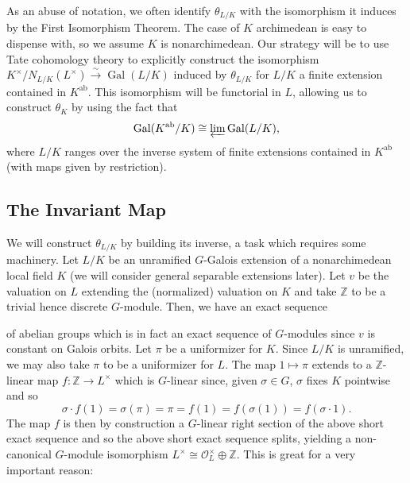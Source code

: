 \documentclass[11pt]{article}
\newcommand{\Z}{\mathbb{Z}}
\newcommand{\iso}{\cong}
\newcommand{\mc}[1]{\mathcal{#1}}
\newcommand{\xto}[1]{\xrightarrow{#1}}
\DeclareMathOperator{\ab}{ab} %
\DeclareMathOperator{\Gal}{Gal}
\renewcommand{\O}{\mc{O}}
\newcommand{\flim}{\varprojlim}
\begin{document}
As an abuse of notation, we often identify $\theta_{L/K}$ with the isomorphism it induces by the First Isomorphism Theorem. The case of $K$ archimedean is easy to dispense with, so we assume $K$ is nonarchimedean. Our strategy will be to use Tate cohomology theory to explicitly construct the isomorphism $K^{\times}/N_{L/K}(L^{\times})\xto{\sim}\Gal(L/K)$ induced by $\theta_{L/K}$ for $L/K$ a finite extension contained in $K^{\ab}$. This isomorphism will be functorial in $L$, allowing us to construct $\theta_K$ by using the fact that 
$$\Gal(K^{\ab}/K)\iso\flim\Gal(L/K),$$
where $L/K$ ranges over the inverse system of finite extensions contained in $K^{\ab}$ (with maps given by restriction). 

\subsection{The Invariant Map}
We will construct $\theta_{L/K}$ by building its inverse, a task which requires some machinery. Let $L/K$ be an unramified $G$-Galois extension of a nonarchimedean local field $K$ (we will consider general separable extensions later). Let $v$ be the valuation on $L$ extending the (normalized) valuation on $K$ and take $\Z$ to be a trivial hence discrete $G$-module. Then, we have an exact sequence
\begin{center}
\end{center}
of abelian groups which is in fact an exact sequence of $G$-modules since $v$ is constant on Galois orbits. Let $\pi$ be a uniformizer for $K$. Since $L/K$ is unramified, we may also take $\pi$ to be a uniformizer for $L$. The map $1\mapsto\pi$ extends to a $\Z$-linear map $f: \Z\to L^{\times}$ which is $G$-linear since, given $\sigma\in G$, $\sigma$ fixes $K$ pointwise and so 
$$\sigma\cdot f(1)=\sigma(\pi)=\pi=f(1)=f(\sigma(1))=f(\sigma\cdot1).$$
The map $f$ is then by construction a $G$-linear right section of the above short exact sequence and so the above short exact sequence splits, yielding a non-canonical $G$-module isomorphism $L^{\times}\iso\O_L^{\times}\oplus\Z$. This is great for a very important reason:
\end{document}

